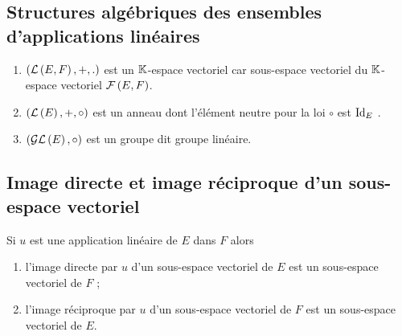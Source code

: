 \subsection{Structures algébriques des ensembles d’applications linéaires}
\begin{defprop}
    \begin{enumerate}
        \item \(\left(\mathcal{L}\left(E,F\right), +, .\right)\) est un \(\mathbb{K}\)-espace vectoriel car sous-espace vectoriel du \(\mathbb{K}\)-espace vectoriel \(\mathcal{F}\left(E, F \right)\).
        \item \(\left(\mathcal{L}\left(E\right), +, \circ \right)\) est un anneau dont l’élément neutre pour la loi \(\circ \) est \(\mathrm{Id}_{E}\) .
        \item \(\left(\mathcal{GL}\left(E\right), \circ \right)\) est un groupe dit groupe linéaire.
    \end{enumerate}
\end{defprop}

\subsection{Image directe et image réciproque d’un sous-espace vectoriel}
\begin{defprop}
    Si \(u\) est une application linéaire de \(E\) dans \(F\) alors
    \begin{enumerate}
        \item l’image directe par \(u\) d’un sous-espace vectoriel de \(E\) est un sous-espace vectoriel de \(F\) ;
        \item l’image réciproque par \(u\) d’un sous-espace vectoriel de \(F\) est un sous-espace vectoriel de \(E\).
    \end{enumerate}
\end{defprop}
